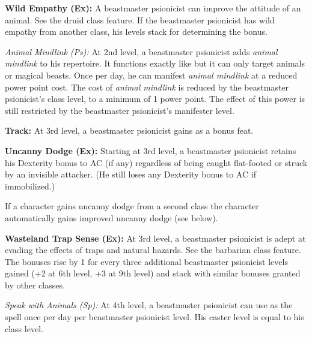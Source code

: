 {\textbf{Wild Empathy (Ex):} A beastmaster psionicist can improve the attitude of an animal. See the druid class feature. If the beastmaster psionicist has wild empathy from another class, his levels stack for determining the bonus.

\textit{Animal Mindlink (Ps):} At 2nd level, a beastmaster psionicist adds \emph{animal mindlink} to his repertoire. It functions exactly like  but it can only target animals or magical beasts. Once per day, he can manifest \emph{animal mindlink} at a reduced power point cost. The cost of \emph{animal mindlink} is reduced by the beastmaster psionicist's class level, to a minimum of 1 power point. The effect of this power is still restricted by the beastmaster psionicist's manifester level.

\textbf{Track:} At 3rd level, a beastmaster psionicist gains  as a bonus feat.

\textbf{Uncanny Dodge (Ex):} Starting at 3rd level, a beastmaster psionicist retains his Dexterity bonus to AC (if any) regardless of being caught flat-footed or struck by an invisible attacker. (He still loses any Dexterity bonus to AC if immobilized.)

If a character gains uncanny dodge from a second class the character automatically gains improved uncanny dodge (see below).

\textbf{Wasteland Trap Sense (Ex):} At 3rd level, a beastmaster psionicist is adept at evading the effects of traps and natural hazards. See the barbarian class feature. The bonuses rise by 1 for every three additional beastmaster psionicist levels gained (+2 at 6th level, +3 at 9th level) and stack with similar bonuses granted by other classes.



\textit{Speak with Animals (Sp):} At 4th level, a beastmaster psionicist can use  as the spell once per day per beastmaster psionicist level. His caster level is equal to his class level.

}
